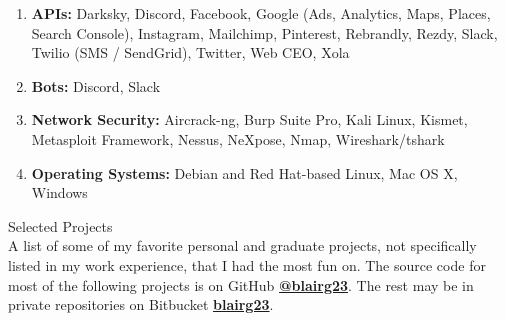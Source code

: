 \documentclass[oneside]{article}%
\begin{document}
\begin{enumerate}[]
	\item \textbf{APIs:} Darksky, Discord, Facebook, Google (Ads, Analytics, Maps, Places, Search Console), Instagram, Mailchimp, Pinterest, Rebrandly, Rezdy, Slack, Twilio (SMS / SendGrid), Twitter, Web CEO, Xola
	\item \textbf{Bots:} Discord, Slack
	\item \textbf{Network Security:} Aircrack-ng, Burp Suite Pro, Kali Linux, Kismet, Metasploit Framework, Nessus, NeXpose, Nmap, Wireshark/tshark
	\item \textbf{Operating Systems:} Debian and Red Hat-based Linux, Mac OS X, Windows
\end{enumerate}

\newpage
\noindent
\huge{Selected Projects}\\
\small
A list of some of my favorite personal and graduate projects, not specifically listed in my work experience, that I had the most fun on. The source code for most of the following projects is on GitHub \textbf{\href{https://github.com/blairg23}{@blairg23}}. The rest may be in private repositories on Bitbucket \textbf{\href{https://bitbucket.com/blairg23}{blairg23}}.
\end{document}
